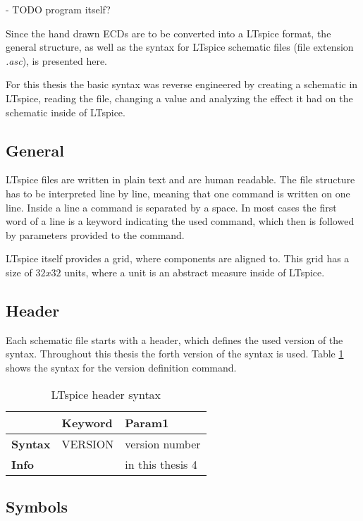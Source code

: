 - TODO program itself?

Since the hand drawn \acp{ECD} are to be converted into a LTspice format, the general structure, as well as the syntax for LTspice schematic files (file extension \textit{.asc}), is presented here.

For this thesis the basic syntax was reverse engineered by creating a schematic in LTspice, reading the file, changing a value and analyzing the effect it had on the schematic inside of LTspice.

\subsection{General}
LTspice files are written in plain text and are human readable.
The file structure has to be interpreted line by line, meaning that one command is written on one line.
Inside a line a command is separated by a space.
In most cases the first word of a line is a keyword indicating the used command, which then is followed by parameters provided to the command.

LTspice itself provides a grid, where components are aligned to.
This grid has a size of $32x32$ units, where a unit is an abstract measure inside of LTspice.

\subsection{Header}

Each schematic file starts with a header, which defines the used version of the syntax.
Throughout this thesis the forth version of the syntax is used. Table \ref{tab:ltheader_syntax} shows the syntax for the version definition command.

\begin{table}[H]
\begin{center}

\begin{tabular}{l|l|l}
    & \textbf{Keyword} & \textbf{Param1}\\
    \hline
    \textbf{Syntax} & VERSION & version number\\
    \textbf{Info} & & in this thesis 4
\end{tabular}
\caption{LTspice header syntax}
\label{tab:ltheader_syntax}

\end{center}
\end{table}


\subsection{Symbols}

